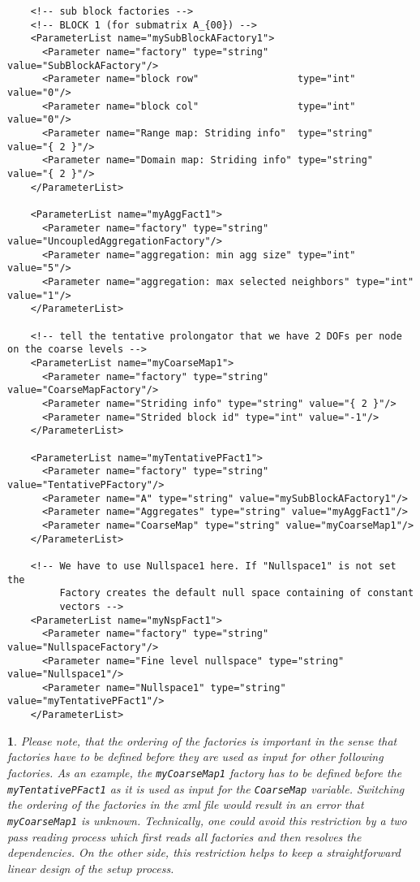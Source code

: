\documentclass[10pt,fleqn]{book}
\newtheorem*{mycomment}{\ding{42}}
\begin{document}
\begin{lstlisting}
    <!-- sub block factories -->
    <!-- BLOCK 1 (for submatrix A_{00}) -->
    <ParameterList name="mySubBlockAFactory1">
      <Parameter name="factory" type="string" value="SubBlockAFactory"/>
      <Parameter name="block row"                 type="int"     value="0"/>
      <Parameter name="block col"                 type="int"     value="0"/>
      <Parameter name="Range map: Striding info"  type="string"  value="{ 2 }"/>
      <Parameter name="Domain map: Striding info" type="string"  value="{ 2 }"/>
    </ParameterList>

    <ParameterList name="myAggFact1">
      <Parameter name="factory" type="string" value="UncoupledAggregationFactory"/>
      <Parameter name="aggregation: min agg size" type="int" value="5"/>
      <Parameter name="aggregation: max selected neighbors" type="int" value="1"/>
    </ParameterList>

    <!-- tell the tentative prolongator that we have 2 DOFs per node on the coarse levels -->
    <ParameterList name="myCoarseMap1">
      <Parameter name="factory" type="string" value="CoarseMapFactory"/>
      <Parameter name="Striding info" type="string" value="{ 2 }"/>
      <Parameter name="Strided block id" type="int" value="-1"/>
    </ParameterList>

    <ParameterList name="myTentativePFact1">
      <Parameter name="factory" type="string" value="TentativePFactory"/>
      <Parameter name="A" type="string" value="mySubBlockAFactory1"/>
      <Parameter name="Aggregates" type="string" value="myAggFact1"/>
      <Parameter name="CoarseMap" type="string" value="myCoarseMap1"/>
    </ParameterList>

    <!-- We have to use Nullspace1 here. If "Nullspace1" is not set the
         Factory creates the default null space containing of constant
         vectors -->
    <ParameterList name="myNspFact1">
      <Parameter name="factory" type="string" value="NullspaceFactory"/>
      <Parameter name="Fine level nullspace" type="string" value="Nullspace1"/>
      <Parameter name="Nullspace1" type="string" value="myTentativePFact1"/>
    </ParameterList>
\end{lstlisting}

\begin{mycomment}
Please note, that the ordering of the factories is important in the sense that factories have to be defined before they are used as input
for other following factories. As an example, the \texttt{myCoarseMap1} factory has to be defined before the \texttt{myTentativePFact1} as it is used as input for the \texttt{CoarseMap} variable. Switching the ordering of the factories in the xml file would result in an error that \texttt{myCoarseMap1} is unknown. Technically, one could avoid this restriction by a two pass reading process which first reads all factories and then resolves the dependencies. On the other side, this restriction helps to keep a straightforward linear design of the setup process.
\end{mycomment}
\end{document}
